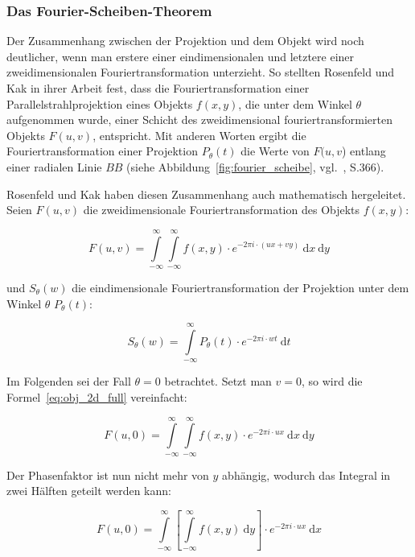 \subsubsection{Das Fourier-Scheiben-Theorem}\label{sssec:fourier_scheibe}

Der Zusammenhang zwischen der Projektion und dem Objekt wird noch deutlicher, wenn man erstere einer eindimensionalen
und letztere einer zweidimensionalen Fouriertransformation unterzieht. So stellten Rosenfeld und Kak in ihrer Arbeit
fest, dass die Fouriertransformation einer Parallelstrahlprojektion eines Objekts $f(x, y)$, die unter dem Winkel
$\theta$ aufgenommen wurde, einer Schicht des zweidimensional fouriertransformierten Objekts $F(u, v)$, entspricht. Mit
anderen Worten ergibt die Fouriertransformation einer Projektion $P_{\theta}(t)$ die Werte von $F(u, v$) entlang einer
radialen Linie $BB$ (siehe Abbildung~\ref{fig:fourier_scheibe}, vgl.~\cite{rosenkak}, S.366).

Rosenfeld und Kak haben diesen Zusammenhang auch mathematisch hergeleitet. Seien $F(u, v)$ die zweidimensionale
Fouriertransformation des Objekts $f(x, y)$:

\begin{equation}\label{eq:obj_2d_full}
    F(u, v) = \int\limits_{-\infty}^{\infty} \int\limits_{-\infty}^{\infty} f(x, y) \cdot e^{-2 \pi i \cdot(u x + v y)}\
        \mathrm{d} x\ \mathrm{d} y
\end{equation}

und $S_{\theta}(w)$ die eindimensionale Fouriertransformation der Projektion unter dem Winkel $\theta$ $P_{\theta}(t)$:

\begin{equation}\label{eq:proj_fft}
    S_{\theta}(w) = \int\limits_{-\infty}^{\infty} P_{\theta}(t) \cdot e^{-2 \pi i \cdot w t}\ \mathrm{d} t
\end{equation}

Im Folgenden sei der Fall $\theta = 0$ betrachtet. Setzt man $v = 0$, so wird die Formel~\ref{eq:obj_2d_full}
vereinfacht:

\begin{equation}
    F(u, 0) = \int\limits_{-\infty}^{\infty} \int\limits_{-\infty}^{\infty} f(x, y) \cdot e^{-2 \pi i \cdot u x}\
    \mathrm{d} x\ \mathrm{d} y
\end{equation}

Der Phasenfaktor ist nun nicht mehr von $y$ abhängig, wodurch das Integral in zwei Hälften geteilt werden kann:

\begin{equation}\label{eq:obj_2d_split}
    F(u, 0) = \int\limits_{-\infty}^{\infty} \left[\int\limits_{-\infty}^{\infty} f(x, y)\ \mathrm{d} y \right] \cdot
    e^{-2 \pi i \cdot u x}\ \mathrm{d} x
\end{equation}

